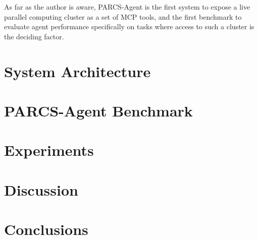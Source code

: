 \documentclass[preprints,article,submit,pdftex,moreauthors]{Definitions/mdpi}
\begin{document}
As far as the author is aware, PARCS-Agent is the first system to expose a live parallel computing cluster as a set of MCP tools, and the first benchmark to evaluate agent performance specifically on tasks where access to such a cluster is the deciding factor.

\section{System Architecture}

\section{PARCS-Agent Benchmark}

\section{Experiments}

\section{Discussion}

\section{Conclusions}

\vspace{6pt} 



\end{document}
